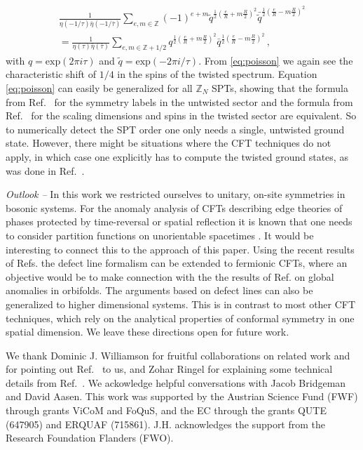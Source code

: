 \documentclass[aps,pra,twocolumn,superscriptaddress,10pt,article,nofootinbib,showpacs]{revtex4-1}
\begin{document}
\begin{align}\label{eq:poisson}
\frac{1}{\eta(-1/\tau)\bar{\eta}(-1/\bar{\tau})}\sum_{e,m\in\mathbb{Z}}(-1)^{e+m}\tilde{q}^{\frac{1}{2}\left(\frac{e}{R}+m\frac{R}{2}\right)^2}\bar{\tilde{q}}^{\frac{1}{2}\left(\frac{e}{R}-m\frac{R}{2}\right)^2} \nonumber \\
= \frac{1}{\eta(\tau)\bar{\eta}(\bar{\tau})}\sum_{e,m\in\mathbb{Z}+1/2}q^{\frac{1}{2}\left(\frac{e}{R}+m\frac{R}{2}\right)^2}\bar{q}^{\frac{1}{2}\left(\frac{e}{R}-m\frac{R}{2}\right)^2}\, ,
\end{align}
with $q=\text{exp}(2\pi i \tau)$ and $\tilde{q}=\text{exp}(-2\pi i/ \tau)$. From \eqref{eq:poisson} we again see the characteristic shift of $1/4$ in the spins of the twisted spectrum. Equation \eqref{eq:poisson} can easily be generalized for all $\mathbb{Z}_N$ SPTs, showing that the formula from Ref.~\cite{ChenWen} for the symmetry labels in the untwisted sector and the formula from Ref.~\cite{SantosWang} for the scaling dimensions and spins in the twisted sector are equivalent. So to numerically detect the SPT order one only needs a single, untwisted ground state. However, there might be situations where the CFT techniques do not apply, in which case one explicitly has to compute the twisted ground states, as was done in Ref.~\cite{Zaletel}.

\emph{Outlook --} In this work we restricted ourselves to unitary, on-site symmetries in bosonic systems. For the anomaly analysis of CFTs describing edge theories of phases protected by time-reversal or spatial reflection it is known that one needs to consider partition functions on unorientable spacetimes \cite{HsiehSule}. It would be interesting to connect this to the approach of this paper. Using the recent results of Refs. \cite{WilliamsonBultinck,FermionicPEPSpaper,AasenLake} the defect line formalism can be extended to fermionic CFTs, where an objective would be to make connection with the the results of Ref. \cite{FreedVafa} on global anomalies in orbifolds. The arguments based on defect lines can also be generalized to higher dimensional systems. This is in contrast to most other CFT techniques, which rely on the analytical properties of conformal symmetry in one spatial dimension. We leave these directions open for future work.

\begin{acknowledgements}
We thank Dominic J. Williamson for fruitful collaborations on related work and for pointing out Ref.~\cite{Mignard} to us, and Zohar Ringel for explaining some technical details from Ref.~\cite{ScaffidiRingel}. We ackowledge helpful conversations with Jacob Bridgeman and David Aasen. This work was supported by the Austrian Science Fund (FWF) through grants ViCoM and FoQuS, and the EC through the grants QUTE (647905) and ERQUAF (715861). J.H. acknowledges the support from the Research Foundation Flanders (FWO).
\end{acknowledgements}
\end{document}
